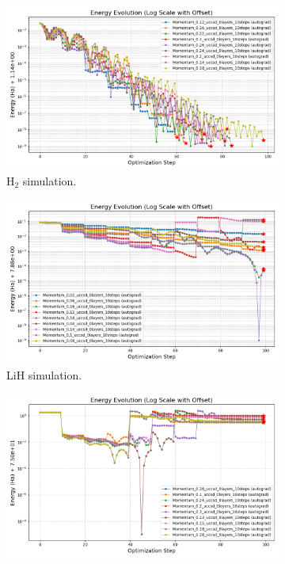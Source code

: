 \begin{figure}[H]
  \centering
  \begin{subfigure}{0.45\textwidth}
    \includegraphics[width=\textwidth]{data/Stepsize/results_H2/energy_evolution_log_offset.png}
    \caption{H$_2$ simulation.}
    \label{fig:step_size_h2}
  \end{subfigure}
  \begin{subfigure}{0.45\textwidth}
    \includegraphics[width=\textwidth]{data/Stepsize/results_LiH/energy_evolution_log_offset.png}
    \caption{LiH simulation.}
    \label{fig:step_size_lih}
  \end{subfigure}
  \begin{subfigure}{0.45\textwidth}
    \includegraphics[width=\textwidth]{data/Stepsize/results_H2O/energy_evolution_log_offset.png}

\end{subfigure}
\end{figure}

